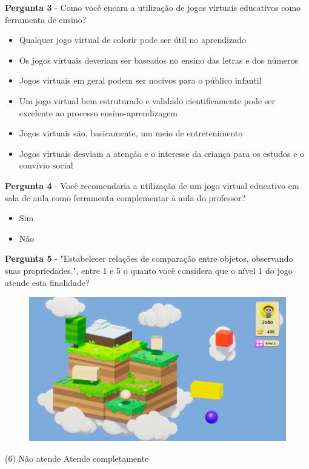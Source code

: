 \documentclass[article,12pt,openany,oneside,a4paper,english,brazil]{abntex2}
\begin{document}
\textbf{Pergunta 3} - Como você encara a utilização de jogos virtuais educativos como ferramenta de ensino?
\begin{itemize}
     \item Qualquer jogo virtual  de colorir pode ser útil no aprendizado
     \item Os jogos virtuais deveriam ser baseados no ensino das letras e dos números
     \item Jogos virtuais em geral podem ser nocivos para o público infantil
     \item Um jogo virtual  bem estruturado e validado cientificamente pode ser excelente ao processo ensino-aprendizagem
     \item Jogos virtuais são, basicamente, um meio de entretenimento
     \item Jogos virtuais desviam a atenção e o interesse da criança para os estudos e o convívio social
\end{itemize}

\textbf{Pergunta 4} - Você recomendaria a utilização de um jogo virtual educativo em sala de aula como ferramenta complementar à aula do professor?
\begin{itemize}
     \item Sim
     \item Não
\end{itemize}

\textbf{Pergunta 5} - "Estabelecer relações de comparação entre objetos, observando suas propriedades.", entre 1 e 5 o quanto você considera que o nível 1 do jogo atende esta finalidade?

\begin{figure}[H]
    \centering
    \label{fig:aluno_pergunta_5}
    \includegraphics[width=0.8\linewidth]{GameScreenshots/Level1.png}
\end{figure}

\normalfont
\begin{tasks}[style=enumerate, item-format={\normalfont\tiny}, after-item-skip=4mm](6)
\task Não atende
\task 
\task 
\task 
\task Atende completamente
\end{tasks}
\end{document}
